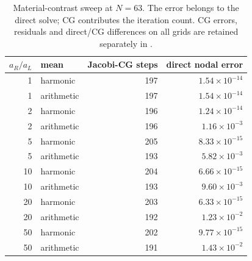 \begin{table}[htbp]
\centering
\small
\setlength{\tabcolsep}{4pt}
\begin{tabular}{rlrr}
\toprule
$a_R/a_L$ & mean & Jacobi-CG steps & direct nodal error \\
\midrule
1 & harmonic & 197 & $1.54\times10^{-14}$ \\
1 & arithmetic & 197 & $1.54\times10^{-14}$ \\
2 & harmonic & 196 & $1.24\times10^{-14}$ \\
2 & arithmetic & 196 & $1.16\times10^{-3}$ \\
5 & harmonic & 205 & $8.33\times10^{-15}$ \\
5 & arithmetic & 193 & $5.82\times10^{-3}$ \\
10 & harmonic & 204 & $6.66\times10^{-15}$ \\
10 & arithmetic & 193 & $9.60\times10^{-3}$ \\
20 & harmonic & 203 & $6.33\times10^{-15}$ \\
20 & arithmetic & 192 & $1.23\times10^{-2}$ \\
50 & harmonic & 202 & $9.77\times10^{-15}$ \\
50 & arithmetic & 191 & $1.43\times10^{-2}$ \\
\bottomrule
\end{tabular}
\caption{Material-contrast sweep at $N=63$. The error belongs to the direct solve; CG contributes the iteration count. CG errors, residuals and direct/CG differences on all grids are retained separately in .}
\label{tab:variable-contrast}
\end{table}
